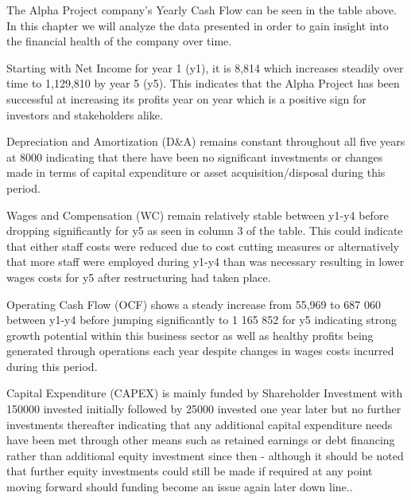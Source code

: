 


The Alpha Project company's Yearly Cash Flow can be seen in the table above. In this chapter we will analyze the data presented in order to gain insight into the financial health of the company over time. 

Starting with Net Income for year 1 (y1), it is 8,814 which increases steadily over time to 1,129,810 by year 5 (y5). This indicates that the Alpha Project has been successful at increasing its profits year on year which is a positive sign for investors and stakeholders alike. 

Depreciation and Amortization (D&A) remains constant throughout all five years at 8000 indicating that there have been no significant investments or changes made in terms of capital expenditure or asset acquisition/disposal during this period. 

Wages and Compensation (WC) remain relatively stable between y1-y4 before dropping significantly for y5 as seen in column 3 of the table. This could indicate that either staff costs were reduced due to cost cutting measures or alternatively that more staff were employed during y1-y4 than was necessary resulting in lower wages costs for y5 after restructuring had taken place.  

Operating Cash Flow (OCF) shows a steady increase from 55,969 to 687 060 between y1-y4 before jumping significantly to 1 165 852 for y5 indicating strong growth potential within this business sector as well as healthy profits being generated through operations each year despite changes in wages costs incurred during this period. 

 Capital Expenditure (CAPEX) is mainly funded by Shareholder Investment with 150000 invested initially followed by 25000 invested one year later but no further investments thereafter indicating that any additional capital expenditure needs have been met through other means such as retained earnings or debt financing rather than additional equity investment since then - although it should be noted that further equity investments could still be made if required at any point moving forward should funding become an issue again later down line..  

